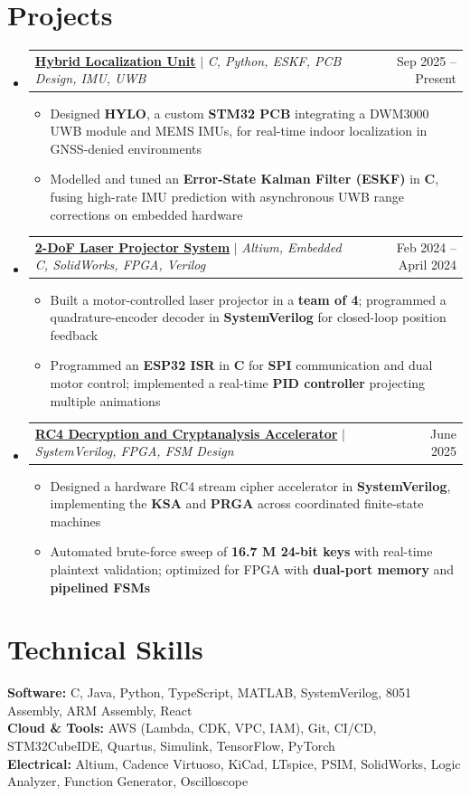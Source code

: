 \documentclass[letterpaper,11pt]{article}
\makeatletter
\newcommand{\resumeItem}[1]{
  \item\small{
    {#1 \vspace{-2pt}}
  }
}
\newcommand{\resumeProjectHeading}[2]{
    \item
    \begin{tabular*}{0.97\textwidth}{l@{\extracolsep{\fill}}r}
      \small#1 & #2 \\
    \end{tabular*}\vspace{-10pt}
}
\newcommand{\resumeSubHeadingListStart}{\begin{itemize}[leftmargin=0.15in, label={}]}
\newcommand{\resumeSubHeadingListEnd}{\end{itemize}\vspace{-5pt}}
\newcommand{\resumeItemListStart}{\begin{itemize}[leftmargin=0.15in]\vspace{1pt}}
\newcommand{\resumeItemListEnd}{\end{itemize}\vspace{-5pt}}
\makeatother
\begin{document}
\section{Projects}
  \resumeSubHeadingListStart
    \resumeProjectHeading
        {\href{https://yusufzeaulhasan.github.io/portfolio/work/multi-sensor-fusion}{\textbf{Hybrid Localization Unit}} $|$ \emph{C, Python, ESKF, PCB Design, IMU, UWB}}{Sep 2025 -- Present}
        \resumeItemListStart
          \resumeItem{Designed \textbf{HYLO}, a custom \textbf{STM32 PCB} integrating a DWM3000 UWB module and MEMS IMUs, for real-time indoor localization in GNSS-denied environments}
          \resumeItem{Modelled and tuned an \textbf{Error-State Kalman Filter (ESKF)} in \textbf{C}, fusing high-rate IMU prediction with asynchronous UWB range corrections on embedded hardware}
        \resumeItemListEnd
    \resumeProjectHeading
        {\href{https://yusufzeaulhasan.github.io/portfolio/work/laser-projector}{\textbf{2-DoF Laser Projector System}} $|$ \emph{Altium, Embedded C, SolidWorks, FPGA, Verilog}}{Feb 2024 -- April 2024}
        \resumeItemListStart
          \resumeItem{Built a motor-controlled laser projector in a \textbf{team of 4}; programmed a quadrature-encoder decoder in \textbf{SystemVerilog} for closed-loop position feedback}
          \resumeItem{Programmed an \textbf{ESP32 ISR} in \textbf{C} for \textbf{SPI} communication and dual motor control; implemented a real-time \textbf{PID controller} projecting multiple animations}
        \resumeItemListEnd
    \resumeProjectHeading
        {\href{https://yusufzeaulhasan.github.io/portfolio/work/rc4-accelerator}{\textbf{RC4 Decryption and Cryptanalysis Accelerator}} $|$ \emph{SystemVerilog, FPGA, FSM Design}}{June 2025}
        \resumeItemListStart
          \resumeItem{Designed a hardware RC4 stream cipher accelerator in \textbf{SystemVerilog}, implementing the \textbf{KSA} and \textbf{PRGA} across coordinated finite-state machines}
          \resumeItem{Automated brute-force sweep of \textbf{16.7 M 24-bit keys} with real-time plaintext validation; optimized for FPGA with \textbf{dual-port memory} and \textbf{pipelined FSMs}}
        \resumeItemListEnd
  \resumeSubHeadingListEnd
\vspace{-10pt}

\section{Technical Skills}
 \begin{itemize}[leftmargin=0.05in, label={}]
    \small{\item{
     \textbf{Software:} {C, Java, Python, TypeScript, MATLAB, SystemVerilog, 8051 Assembly, ARM Assembly, React} \\
     \textbf{Cloud \& Tools:} {AWS (Lambda, CDK, VPC, IAM), Git, CI/CD, STM32CubeIDE, Quartus, Simulink, TensorFlow, PyTorch} \\
     \textbf{Electrical:} {Altium, Cadence Virtuoso, KiCad, LTspice, PSIM, SolidWorks, Logic Analyzer, Function Generator, Oscilloscope} \\
    }}
 \end{itemize}

\end{document}

